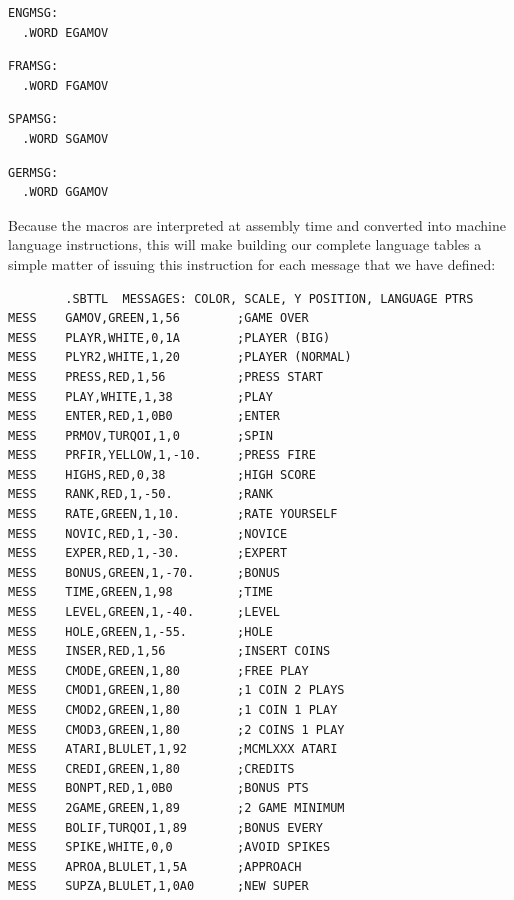 \begin{minipage}[c]{0.23\linewidth}
\begin{lstlisting}[basicstyle=\scriptsize\ttfamily]
ENGMSG:
  .WORD EGAMOV
\end{lstlisting}
\end{minipage}
\hspace{0.2cm}
\begin{minipage}[c]{0.23\linewidth}
\begin{lstlisting}[basicstyle=\scriptsize\ttfamily]
FRAMSG:
  .WORD FGAMOV
\end{lstlisting}
\end{minipage}
\hspace{0.2cm}
\begin{minipage}[c]{0.23\linewidth}
\begin{lstlisting}[basicstyle=\scriptsize\ttfamily]
SPAMSG:
  .WORD SGAMOV
\end{lstlisting}
\end{minipage}
\hspace{0.2cm}
\begin{minipage}[c]{0.23\linewidth}
\begin{lstlisting}[basicstyle=\scriptsize\ttfamily]
GERMSG:
  .WORD GGAMOV
\end{lstlisting}
\end{minipage}

Because the macros are interpreted at assembly time and converted into machine language instructions,
this will make building our complete language tables a simple matter of issuing this instruction
for each message that we have defined:
\begin{lstlisting}
        .SBTTL  MESSAGES: COLOR, SCALE, Y POSITION, LANGUAGE PTRS
MESS    GAMOV,GREEN,1,56        ;GAME OVER
MESS    PLAYR,WHITE,0,1A        ;PLAYER (BIG)
MESS    PLYR2,WHITE,1,20        ;PLAYER (NORMAL)
MESS    PRESS,RED,1,56          ;PRESS START
MESS    PLAY,WHITE,1,38         ;PLAY
MESS    ENTER,RED,1,0B0         ;ENTER
MESS    PRMOV,TURQOI,1,0        ;SPIN
MESS    PRFIR,YELLOW,1,-10.     ;PRESS FIRE
MESS    HIGHS,RED,0,38          ;HIGH SCORE
MESS    RANK,RED,1,-50.         ;RANK
MESS    RATE,GREEN,1,10.        ;RATE YOURSELF
MESS    NOVIC,RED,1,-30.        ;NOVICE
MESS    EXPER,RED,1,-30.        ;EXPERT
MESS    BONUS,GREEN,1,-70.      ;BONUS
MESS    TIME,GREEN,1,98         ;TIME
MESS    LEVEL,GREEN,1,-40.      ;LEVEL
MESS    HOLE,GREEN,1,-55.       ;HOLE
MESS    INSER,RED,1,56          ;INSERT COINS
MESS    CMODE,GREEN,1,80        ;FREE PLAY
MESS    CMOD1,GREEN,1,80        ;1 COIN 2 PLAYS
MESS    CMOD2,GREEN,1,80        ;1 COIN 1 PLAY
MESS    CMOD3,GREEN,1,80        ;2 COINS 1 PLAY
MESS    ATARI,BLULET,1,92       ;MCMLXXX ATARI
MESS    CREDI,GREEN,1,80        ;CREDITS
MESS    BONPT,RED,1,0B0         ;BONUS PTS
MESS    2GAME,GREEN,1,89        ;2 GAME MINIMUM
MESS    BOLIF,TURQOI,1,89       ;BONUS EVERY
MESS    SPIKE,WHITE,0,0         ;AVOID SPIKES
MESS    APROA,BLULET,1,5A       ;APPROACH
MESS    SUPZA,BLULET,1,0A0      ;NEW SUPER
\end{lstlisting}

